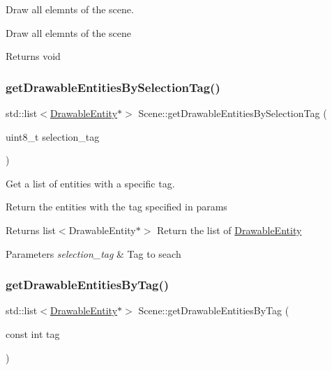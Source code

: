 Draw all elemnts of the scene. 

Draw all elemnts of the scene

\begin{DoxyReturn}{Returns}
void 
\end{DoxyReturn}
\mbox{\label{class_scene_a03b92c636fdf1158bd7408e1c56edd7e}} 
\subsubsection{\texorpdfstring{get\+Drawable\+Entities\+By\+Selection\+Tag()}{getDrawableEntitiesBySelectionTag()}}
{\footnotesize\ttfamily std\+::list$<$\hyperlink{class_drawable_entity}{Drawable\+Entity}$\ast$$>$ Scene\+::get\+Drawable\+Entities\+By\+Selection\+Tag (\begin{DoxyParamCaption}\item[{uint8\+\_\+t}]{selection\+\_\+tag }\end{DoxyParamCaption})}



Get a list of entities with a specific tag. 

Return the entities with the tag specified in params

\begin{DoxyReturn}{Returns}
list$<$\+Drawable\+Entity$\ast$$>$ Return the list of \hyperlink{class_drawable_entity}{Drawable\+Entity} 
\end{DoxyReturn}

\begin{DoxyParams}{Parameters}
{\em selection\+\_\+tag} & Tag to seach \\
\hline
\end{DoxyParams}
\mbox{\label{class_scene_a589e481e1ee58d356f1424a20f9decff}} 
\subsubsection{\texorpdfstring{get\+Drawable\+Entities\+By\+Tag()}{getDrawableEntitiesByTag()}}
{\footnotesize\ttfamily std\+::list$<$\hyperlink{class_drawable_entity}{Drawable\+Entity}$\ast$$>$ Scene\+::get\+Drawable\+Entities\+By\+Tag (\begin{DoxyParamCaption}\item[{const int}]{tag }\end{DoxyParamCaption})}



